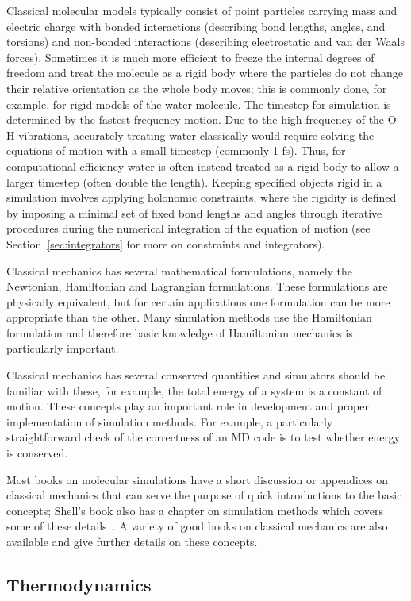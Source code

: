 \documentclass[9pt,bestpractices]{livecoms}
\begin{document}
Classical molecular models typically consist of point particles carrying mass and electric charge with bonded interactions (describing bond lengths, angles, and torsions) and non-bonded interactions (describing electrostatic and van der Waals forces).
Sometimes it is much more efficient to freeze the internal degrees of freedom and treat the molecule as a rigid body where the particles do not change their relative orientation as the whole body moves; this is commonly done, for example, for rigid models of the water molecule.
The timestep for simulation is determined by the fastest frequency motion.
Due to the high frequency of the O-H vibrations, accurately treating water classically would require solving the equations of motion with a small timestep (commonly 1 fs).
Thus, for computational efficiency water is often instead treated as a rigid body to allow a larger timestep (often double the length).
Keeping specified objects rigid in a simulation involves applying holonomic constraints, where the rigidity is defined by imposing a minimal set of fixed bond lengths and angles through iterative procedures during the numerical integration of the equation of motion (see Section~\ref{sec:integrators} for more on constraints and integrators).

Classical mechanics has several mathematical formulations, namely the Newtonian, Hamiltonian and Lagrangian formulations.
These formulations are physically equivalent, but for certain applications one formulation can be more appropriate than the other.
Many simulation methods use the Hamiltonian formulation and therefore basic knowledge of Hamiltonian mechanics is particularly important.

Classical mechanics has several conserved quantities and simulators should be familiar with these, for example, the total energy of a system is a constant of motion.
These concepts play an important role in development and proper implementation of simulation methods.
For example, a particularly straightforward check of the correctness of an MD code is to test whether energy is conserved.

Most books on molecular simulations have a short discussion or appendices on classical mechanics that can serve the purpose of quick introductions to the basic concepts; Shell's book also has a chapter on simulation methods which covers some of these details~\cite{ShellBook}.
A variety of good books on classical mechanics are also available and give further details on these concepts.

\subsection{Thermodynamics}
\label{sec:thermodynamics}
\end{document}
